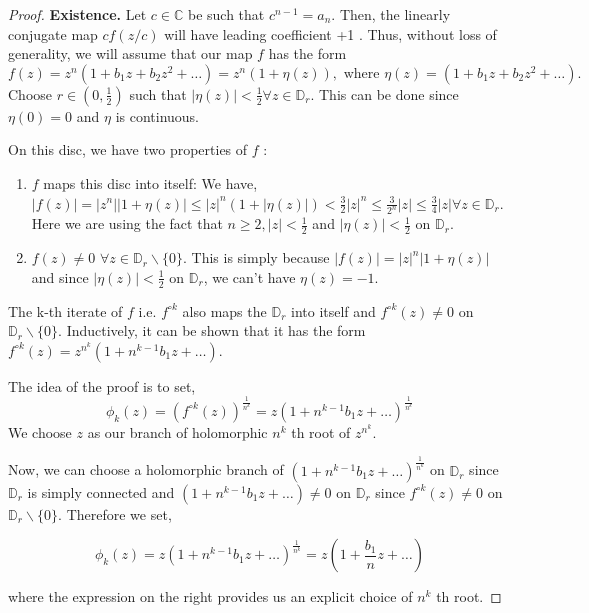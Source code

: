 \begin{proof}
	\textbf{Existence.} Let $c \in \mathbb{C}$ be such that $c^{n-1}=a_{n}$. Then, the linearly conjugate map $c f(z / c)$ will have leading coefficient +1 . Thus, without loss of generality, we will assume that our map $f$ has the form $$f(z)=z^{n}(1+b_{1} z+b_{2} z^{2}+\ldots)=z^{n}(1+\eta(z)), \text{ where }\eta(z)=\left(1+b_{1} z+b_{2} z^{2}+\ldots\right).$$
Choose $r \in\left(0, \frac{1}{2}\right)$ such that $|\eta(z)|<\frac{1}{2} \forall z \in \mathbb{D}_{r}$. This can be done since $\eta(0)=0$ and $\eta$ is continuous.

\noindent On this disc, we have two properties of $f$ :
\begin{enumerate}
  \item $f$ maps this disc into itself:
	We have, $|f(z)|=\left|z^{n}\right||1+\eta(z)| \leq|z|^{n}(1+|\eta(z)|)<\frac{3}{2}|z|^{n} \leq \frac{3}{2^{n}}|z| \leq \frac{3}{4}|z| \forall z \in \mathbb{D}_{r}$. Here we are using the fact that $n \geq 2,|z|<\frac{1}{2}$ and $|\eta(z)|<\frac{1}{2}$ on $\mathbb{D}_{r}$.
  \item $f(z) \neq 0\,\, \forall z \in \mathbb{D}_{r} \backslash\{0\}.$
This is simply because $|f(z)|=|z|^{n}|1+\eta(z)|$ and since $|\eta(z)|<\frac{1}{2}$ on $\mathbb{D}_{r}$, we can't have $\eta(z)=-1$.
\end{enumerate}

\noindent The k-th iterate of $f$ i.e. $f^{\circ k}$ also maps the $\mathbb{D}_{r}$ into itself and $f^{\circ k}(z) \neq 0$ on $\mathbb{D}_{r} \backslash\{0\}$. Inductively, it can be shown that it has the form $f^{\circ k}(z)=z^{n^{k}}\left(1+n^{k-1} b_{1} z+\ldots\right)$.

The idea of the proof is to set,
$$
\phi_{k}(z)=\left(f^{\circ k}(z)\right)^{\frac{1}{n^{k}}}=z\left(1+n^{k-1} b_{1} z+\ldots\right)^{\frac{1}{n^{k}}}
$$
We choose $z$ as our branch of holomorphic $n^{k}$ th root of $z^{n^{k}}$.

Now, we can choose a holomorphic branch of $\left(1+n^{k-1} b_{1} z+\ldots\right)^{\frac{1}{n^{k}}}$ on $\mathbb{D}_{r}$ since $\mathbb{D}_{r}$ is simply connected and $\left(1+n^{k-1} b_{1} z+\ldots\right) \neq 0$ on $\mathbb{D}_{r}$ since $f^{\circ k}(z) \neq 0$ on $\mathbb{D}_{r} \backslash\{0\}$. Therefore we set,

$$
\phi_{k}(z)=z\left(1+n^{k-1} b_{1} z+\ldots\right)^{\frac{1}{n^{k}}}=z\left(1+\frac{b_{1}}{n} z+\ldots\right)
$$

where the expression on the right provides us an explicit choice of $n^{k}$ th root.


\end{proof}
